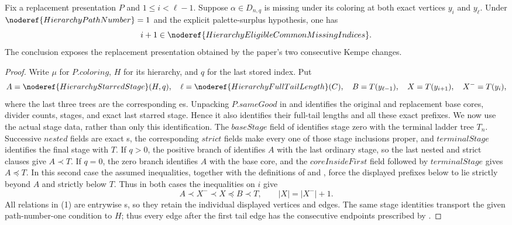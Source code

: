 \begin{lemma}
Fix a replacement presentation \(P\) and
\(1\leq i<\ell-1\).  Suppose
\(\alpha\in D_{n,q}\) is missing under its coloring at both exact vertices
\(y_i\) and \(y_\ell\).  Under
\(\noderef{HierarchyPathNumber}=1\) and the explicit palette-surplus
hypothesis, one has
\[
 i+1\in\noderef{HierarchyEligibleCommonMissingIndices}.
\]
The conclusion exposes the replacement presentation obtained by the
paper's two consecutive Kempe changes.
\end{lemma}
\begin{proof}
Write \(\mu\) for \(P.\mathit{coloring}\), \(H\) for its hierarchy, and
\(q\) for the last stored index.  Put
\[
 A=\noderef{HierarchyStarredStage}(H,q),\quad
 \ell=\noderef{HierarchyFullTailLength}(C),\quad
 B=T(y_{\ell-1}),\quad X=T(y_{i+1}),\quad X^-=T(y_i),
\]
where the last three trees are the corresponding
es.  Unpacking
\(P.\mathit{sameGood}\) in
 and
 identifies the
original and replacement base cores, divider counts, stages, and exact
last starred stage.  Hence it also identifies their full-tail lengths and
all these exact prefixes.  We now use the actual stage data, rather than
only this identification.  The \(\mathit{baseStage}\) field of
 identifies stage zero with the terminal
ladder tree \(T_n\).  Successive \(\mathit{nested}\) fields are exact
s, the corresponding
\(\mathit{strict}\) fields make every one of those stage inclusions
proper, and \(\mathit{terminalStage}\) identifies the final stage with
\(T\).  If \(q>0\), the positive branch of
 identifies \(A\) with the last ordinary
stage, so the last nested and strict clauses give \(A\prec T\).  If
\(q=0\), the zero branch identifies \(A\) with the base core, and the
\(\mathit{coreInsideFirst}\) field followed by
\(\mathit{terminalStage}\) gives \(A\preccurlyeq T\).  In this second
case the assumed inequalities, together with the definitions of
 and
, force the displayed prefixes below to
lie strictly beyond \(A\) and strictly below \(T\).  Thus in both cases
the inequalities on \(i\) give
\[
 A\prec X^-\prec X\preccurlyeq B\prec T,
 \qquad |X|=|X^-|+1.                                      \tag{1}
\]
All relations in (1) are entrywise
s, so they retain the individual
displayed vertices and edges.  The same stage identities transport the
given path-number-one condition to \(H\); thus every edge after the first
tail edge has the consecutive endpoints prescribed by
.


\end{proof}
